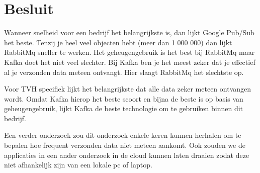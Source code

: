 
\chapter{Besluit}
\label{ch:besluit}

Wanneer snelheid voor een bedrijf het belangrijkste is, dan lijkt Google Pub/Sub het beste. Tenzij je heel veel objecten hebt (meer dan 1 000 000) dan lijkt RabbitMq sneller te werken. Het geheugengebruik is het best bij RabbitMq maar Kafka doet het niet veel slechter. Bij Kafka ben je het meest zeker dat je effectief al je verzonden data meteen ontvangt. Hier slaagt RabbitMq het slechtste op.

Voor TVH specifiek lijkt het belangrijkste dat alle data zeker meteen ontvangen wordt. Omdat Kafka hierop het beste scoort en bijna de beste is op basis van geheugengebruik, lijkt Kafka de beste technologie om te gebruiken binnen dit bedrijf.

Een verder onderzoek zou dit onderzoek enkele keren kunnen herhalen om te bepalen hoe frequent verzonden data niet meteen aankomt. Ook zouden we de applicaties in een ander onderzoek in de cloud kunnen laten draaien zodat deze niet afhankelijk zijn van een lokale pc of laptop.

